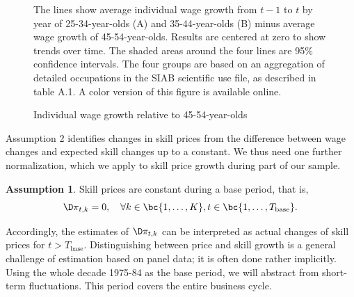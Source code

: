 \documentclass[12pt]{article}
\newcommand{\highlightP}[1]{{\emph{\color{MyPink}{#1}}}}
\theoremstyle{definition}
\newtheorem{assumption}{Assumption}
\begin{document}
\setcounter{figure}{3}
\renewcommand{\thefigure}{\arabic{figure}}
\begin{figure}[H]
    \noindent\caption{Individual wage growth relative to 45-54-year-olds}
    \begin{center}
        \label{bohmOccupationGrowthSkill2024_fig4}
    \end{center}
    {\footnotesize The lines show average individual wage growth from $t-1$ to $t$ by year of 25-34-year-olds (A) and 35-44-year-olds (B) minus average wage growth of 45-54-year-olds. Results are centered at zero to show trends over time. The shaded areas around the four lines are 95\% confidence intervals. The four groups are based on an aggregation of detailed occupations in the SIAB scientific use file, as described in table A.1. A color version of this figure is available online.}
\end{figure}

Assumption 2 identifies changes in skill prices from the difference between wage changes and expected skill changes up to a constant. We thus need one further normalization, which we apply to skill price growth during part of our sample. 

\begin{assumption}
Skill prices are constant during a base period, that is, 
\begin{equation}
    \notag 
    \D \pi_{t, k} = 0, \quad \forall k \in \bc{1, \ldots, K}, t \in \bc{1, \ldots, T_{\text{base}}}.
\end{equation}
\end{assumption}

\highlightP{Under assumption 3, $\G$ is identified from the base period due to its time-invariant nature.} Accordingly, the estimates of $\D \pi_{t,k}$ can be interpreted as actual changes of skill prices for $t > T_{\text{base}}$. Distinguishing between price and skill growth is a general challenge of estimation based on panel data; it is often done rather implicitly. Using the whole decade 1975-84 as the base period, we will abstract from short-term fluctuations. This period covers the entire business cycle.
\end{document}
